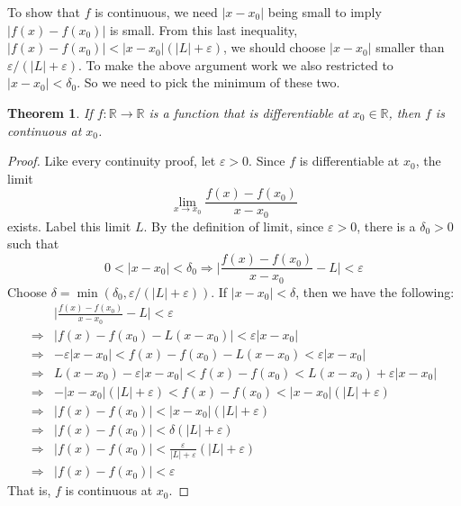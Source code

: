 \documentclass{article}
\theoremstyle{plain}
\newtheorem{theorem}{Theorem}
\begin{document}
    To show that $f$ is continuous, we need $|x-x_{0}|$ being small to
    imply $|f(x)-f(x_{0})|$ is small. From this last inequality,
    $|f(x)-f(x_{0})|<|x-x_{0}|(|L|+\varepsilon)$, we should choose
    $|x-x_{0}|$ smaller than $\varepsilon/(|L|+\varepsilon)$. To make the
    above argument work we also restricted to $|x-x_{0}|<\delta_{0}$. So we
    need to pick the minimum of these two.
    \begin{theorem}
        If $f:\mathbb{R}\rightarrow\mathbb{R}$ is a function that is
        differentiable at $x_{0}\in\mathbb{R}$, then $f$ is continuous
        at $x_{0}$.
    \end{theorem}
    \begin{proof}
        Like every continuity proof, let $\varepsilon>0$. Since $f$ is
        differentiable at $x_{0}$, the limit
        \begin{equation}
            \lim_{x\rightarrow{x}_{0}}\frac{f(x)-f(x_{0})}{x-x_{0}}
        \end{equation}
        exists. Label this limit $L$. By the definition of limit, since
        $\varepsilon>0$, there is a $\delta_{0}>0$ such that
        \begin{equation}
            0<|x-x_{0}|<\delta_{0}\Rightarrow
            \Big|\frac{f(x)-f(x_{0})}{x-x_{0}}-L\Big|<\varepsilon
        \end{equation}
        Choose $\delta=\min(\delta_{0},\varepsilon/(|L|+\varepsilon))$.
        If $|x-x_{0}|<\delta$, then we have the following:
        \begin{align}
            &\Big|\frac{f(x)-f(x_{0})}{x-x_{0}}-L\Big|<\varepsilon\\
            \Rightarrow&|f(x)-f(x_{0})-L(x-x_{0})|<\varepsilon|x-x_{0}|\\
            \Rightarrow&-\varepsilon|x-x_{0}|<
                f(x)-f(x_{0})-L(x-x_{0})<\varepsilon|x-x_{0}|\\
            \Rightarrow&
                L(x-x_{0})-\varepsilon|x-x_{0}|<
                    f(x)-f(x_{0})<L(x-x_{0})+\varepsilon|x-x_{0}|\\
            \Rightarrow&
                -|x-x_{0}|(|L|+\varepsilon)<f(x)-f(x_{0})
                    <|x-x_{0}|(|L|+\varepsilon)\\
            \Rightarrow&
                |f(x)-f(x_{0})|<|x-x_{0}|(|L|+\varepsilon)\\
            \Rightarrow&
                |f(x)-f(x_{0})|<\delta(|L|+\varepsilon)\\
            \Rightarrow&
                |f(x)-f(x_{0})|<\frac{\varepsilon}{|L|+\varepsilon}
                    (|L|+\varepsilon)\\
            \Rightarrow&|f(x)-f(x_{0})|<\varepsilon
        \end{align}
        That is, $f$ is continuous at $x_{0}$.
    \end{proof}
\end{document}
